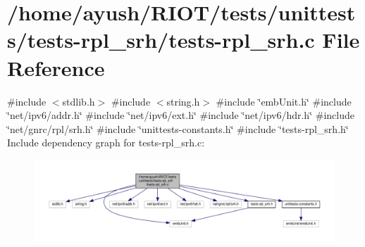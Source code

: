 \hypertarget{tests-rpl__srh_8c}{}\section{/home/ayush/\+R\+I\+O\+T/tests/unittests/tests-\/rpl\+\_\+srh/tests-\/rpl\+\_\+srh.c File Reference}
\label{tests-rpl__srh_8c}
{\ttfamily \#include $<$stdlib.\+h$>$}\newline
{\ttfamily \#include $<$string.\+h$>$}\newline
{\ttfamily \#include \char`\"{}emb\+Unit.\+h\char`\"{}}\newline
{\ttfamily \#include \char`\"{}net/ipv6/addr.\+h\char`\"{}}\newline
{\ttfamily \#include \char`\"{}net/ipv6/ext.\+h\char`\"{}}\newline
{\ttfamily \#include \char`\"{}net/ipv6/hdr.\+h\char`\"{}}\newline
{\ttfamily \#include \char`\"{}net/gnrc/rpl/srh.\+h\char`\"{}}\newline
{\ttfamily \#include \char`\"{}unittests-\/constants.\+h\char`\"{}}\newline
{\ttfamily \#include \char`\"{}tests-\/rpl\+\_\+srh.\+h\char`\"{}}\newline
Include dependency graph for tests-\/rpl\+\_\+srh.c\+:
\nopagebreak
\begin{figure}[H]
\begin{center}
\leavevmode
\includegraphics[width=350pt]{tests-rpl__srh_8c__incl}
\end{center}
\end{figure}
